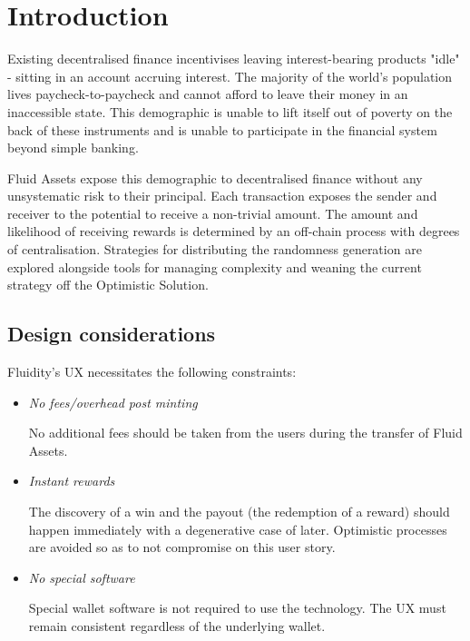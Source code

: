 \section{Introduction}

Existing decentralised finance incentivises leaving interest-bearing products "idle" - sitting in an account accruing interest. The majority of the world's population lives paycheck-to-paycheck and cannot afford to leave their money in an inaccessible state. This demographic is unable to lift itself out of poverty on the back of these instruments and is unable to participate in the financial system beyond simple banking. 

Fluid Assets expose this demographic to decentralised finance without any unsystematic risk to their principal. Each transaction exposes the sender and receiver to the potential to receive a non-trivial amount. The amount and likelihood of receiving rewards is determined by an off-chain process with degrees of centralisation. Strategies for distributing the randomness generation are explored alongside tools for managing complexity and weaning the current strategy off the Optimistic Solution.

\subsection{Design considerations}

Fluidity's UX necessitates the following constraints:

\begin{itemize}
\item \textit{No fees/overhead post minting}

No additional fees should be taken from the users during the transfer of Fluid Assets.

\item \textit{Instant rewards}

The discovery of a win and the payout (the redemption of a reward) should happen immediately with a degenerative case of later. Optimistic processes are avoided so as to not compromise on this user story.

\item \textit{No special software}

Special wallet software is not required to use the technology. The UX must remain consistent regardless of the underlying wallet.
\end{itemize}
